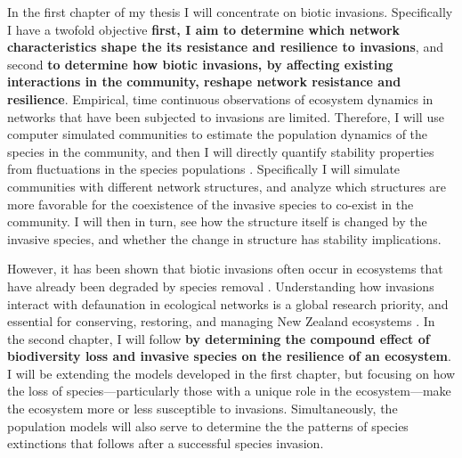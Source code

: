 \documentclass[a4paper]{article}
\begin{document}
In the first chapter of my thesis I will concentrate on biotic invasions.
Specifically I have a twofold objective \textbf{first, I aim to determine which network characteristics shape the its resistance and resilience to invasions}, and second \textbf{to determine how biotic invasions, by affecting existing interactions in the community, reshape network resistance and resilience}.
Empirical, time continuous observations of ecosystem dynamics in networks that have been subjected to invasions are limited.
Therefore, I will use computer simulated communities to estimate the population dynamics of the species in the community, and then I will directly quantify stability properties from fluctuations in the species populations \autocite{Bastolla2009, Garcia-Algarra2013}.
Specifically I will simulate communities with different network structures, and analyze which structures are more favorable for the coexistence of the invasive species to co-exist in the community.
I will then in turn, see how the structure itself is changed by the invasive species, and whether the change in structure has stability implications.

However, it has been shown that biotic invasions often occur in ecosystems that have already been degraded by species removal \autocite{Bennett2015}.
Understanding how invasions interact with defaunation in ecological networks is a global research priority, and essential for conserving, restoring, and managing New Zealand ecosystems \autocite{Newstrom2005}.
In the second chapter, I will follow \textbf{by determining the compound effect of biodiversity loss and invasive species on the resilience of an ecosystem}.
I will be extending the models developed in the first chapter, but focusing on how the loss of species---particularly those with a unique role in the ecosystem---make the ecosystem more or less susceptible to invasions.
Simultaneously, the population models will also serve to determine the the patterns of species extinctions that follows after a successful species invasion.
\end{document}
